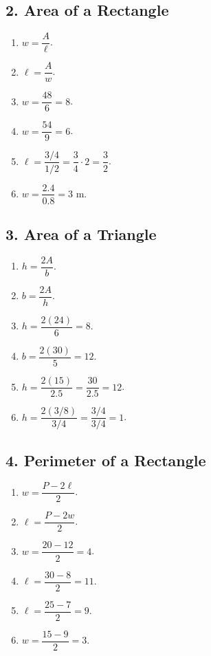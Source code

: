 \documentclass[11pt]{article}
\begin{document}
\subsection*{2. Area of a Rectangle}
\begin{enumerate}[label=\arabic*.,leftmargin=2em,itemsep=2pt]
\item $w = \dfrac{A}{\ell}$.
\item $\ell = \dfrac{A}{w}$.
\item $w = \dfrac{48}{6} = 8$.
\item $w = \dfrac{54}{9} = 6$.
\item $\ell = \dfrac{3/4}{1/2} = \dfrac34 \cdot 2 = \dfrac32$.
\item $w = \dfrac{2.4}{0.8} = 3$ m.
\end{enumerate}

\subsection*{3. Area of a Triangle}
\begin{enumerate}[label=\arabic*.,leftmargin=2em,itemsep=2pt]
\item $h = \dfrac{2A}{b}$.
\item $b = \dfrac{2A}{h}$.
\item $h = \dfrac{2(24)}{6} = 8$.
\item $b = \dfrac{2(30)}{5} = 12$.
\item $h = \dfrac{2(15)}{2.5} = \dfrac{30}{2.5} = 12$.
\item $h = \dfrac{2(3/8)}{3/4} = \dfrac{3/4}{3/4} = 1$.
\end{enumerate}

\subsection*{4. Perimeter of a Rectangle}
\begin{enumerate}[label=\arabic*.,leftmargin=2em,itemsep=2pt]
\item $w = \dfrac{P - 2\ell}{2}$.
\item $\ell = \dfrac{P - 2w}{2}$.
\item $w = \dfrac{20 - 12}{2} = 4$.
\item $\ell = \dfrac{30 - 8}{2} = 11$.
\item $\ell = \dfrac{25 - 7}{2} = 9$.
\item $w = \dfrac{15 - 9}{2} = 3$.
\end{enumerate}
\end{document}
